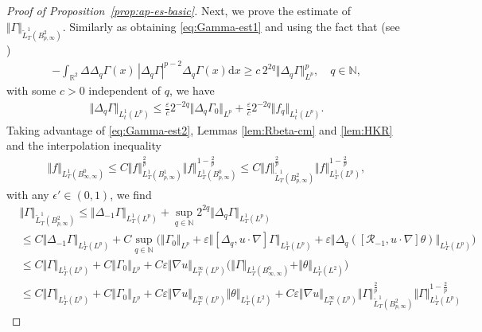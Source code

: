 \documentclass[reqno,11pt,a4paper]{amsart}
\newcommand{\dd}{\mathrm{d}}
\begin{document}
\begin{proof}[Proof of Proposition~\ref{prop:ap-es-basic}]
Next, we prove the estimate of $\Vert \Gamma\Vert _{\widetilde{L}^1_T(B^{2}_{p,\infty})}$.
Similarly as obtaining \eqref{eq:Gamma-est1} and using the fact that (see \cite{CMZ07})
\begin{align*}
  -\int_{\mathbb{R}^2} \Delta \Delta_q \Gamma(x)\, |\Delta_q \Gamma|^{p-2}
  \Delta_q\Gamma(x) \dd x \geq c\, 2^{2q} \Vert \Delta_q \Gamma\Vert _{L^p}^p,
  \quad q\in\mathbb{N},
\end{align*}
with some $c>0$ independent of $q$, we have
\begin{align}\label{eq:Gamma-est2}
  \Vert \Delta_q\Gamma\Vert _{L^1_t(L^p)} \leq \frac{\varepsilon}{c} 2^{-2 q} \Vert \Delta_q \Gamma_0\Vert _{L^p}
  + \frac{\varepsilon}{c} 2^{-2 q} \Vert f_q\Vert _{L^1_t(L^p)}.
\end{align}
Taking advantage of \eqref{eq:Gamma-est2},  Lemmas \ref{lem:Rbeta-cm} and \ref{lem:HKR} 
and the interpolation inequality
\begin{align*}
  \Vert f\Vert _{L^1_T(B^0_{\infty,\infty})} 
  \leq C\Vert f\Vert _{L^1_T(B^1_{p,\infty})}^{\frac{2}{p}} 
  \Vert f\Vert _{L^1_T (B^0_{p,\infty})}^{1-\frac{2}{p}}\leq C\Vert f\Vert _{\widetilde{L}^1_T(B^2_{p,\infty})}^{\frac{2}{p}} 
  \Vert f\Vert _{L^1_T (L^p)}^{1-\frac{2}{p}},
\end{align*}
with any $\epsilon'\in (0,1)$, we find
\begin{align}
  & \Vert \Gamma\Vert _{\widetilde{L}^1_T(B^{2}_{p,\infty})} \leq \Vert \Delta_{-1} \Gamma\Vert _{L^1_T(L^p)}
  + \sup_{q \in \mathbb{N}} 2^{2q} \Vert \Delta_q \Gamma\Vert _{L^1_T(L^p)} \nonumber \\
  & \leq C \Vert \Delta_{-1}\Gamma\Vert _{L^1_T(L^p)}
  + C \sup_{q\in \mathbb{N}} \Big( \Vert \Gamma_0\Vert _{L^p}
  + \varepsilon \Vert [\Delta_q, u\cdot\nabla]\Gamma\Vert _{L^1_T(L^p)}
  + \varepsilon \Vert \Delta_q([\mathcal{R}_{-1},u\cdot\nabla]\theta)\Vert _{L^1_T(L^p)} \Big) \nonumber \\
  & \leq C \Vert \Gamma\Vert _{L^1_T(L^p)}  + C \Vert \Gamma_0\Vert _{L^p} +  C \varepsilon\Vert \nabla u\Vert _{L^\infty_T(L^p)}
  \Big(\Vert \Gamma\Vert _{L^1_T(B^0_{\infty,\infty})} +  \Vert \theta\Vert _{L^1_T(L^2)} \Big)\nonumber\\
  & \leq C \Vert \Gamma\Vert _{L^1_T(L^p)}  + C \Vert \Gamma_0\Vert _{L^p} +  C \varepsilon\Vert \nabla u\Vert _{L^\infty_T(L^p)}
  \Vert \theta\Vert _{L^1_T(L^2)}+  C \varepsilon\Vert \nabla u\Vert _{L^\infty_T(L^p)}\Vert \Gamma\Vert _{\widetilde{L}^1_T(B^2_{p,\infty})}^{\frac{2}{p}} 
  \Vert \Gamma\Vert _{L^1_T (L^p)}^{1-\frac{2}{p}}

\end{align}
\end{proof}
\end{document}
